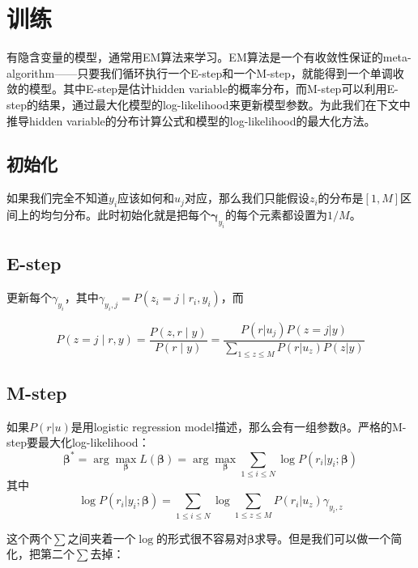 \documentclass[12pt,a4paper]{article}
\newcommand{\V}{\boldsymbol}
\begin{document}
\section{训练}

有隐含变量的模型，通常用EM算法来学习。EM算法是一个有收敛性保证的meta-algorithm——只要我们循环执行一个E-step和一个M-step，就能得到一个单调收敛的模型。其中E-step是估计hidden variable的概率分布，而M-step可以利用E-step的结果，通过最大化模型的log-likelihood来更新模型参数。为此我们在下文中推导hidden variable的分布计算公式和模型的log-likelihood的最大化方法。

\subsection{初始化}

如果我们完全不知道$y_i$应该如何和$u_j$对应，那么我们只能假设$z_i$的分布是$[1,M]$区间上的均匀分布。此时初始化就是把每个$\V\gamma_{y_i}$的每个元素都设置为$1/M$。

\subsection{E-step}

更新每个$\gamma_{y_i}$，其中$\gamma_{y_i,j}=P(z_i=j \mid r_i, y_i)$，而

\begin{equation}
\label{eq:estep}
P(z=j \mid r,y) = \frac{P(z,r \mid y)}{P(r\mid y)} = \frac{P(r|u_j) P(z=j|y)}{\sum_{1\leq z\leq M} P(r|u_z) P(z|y)}
\end{equation}

\subsection{M-step}

如果$P(r|u)$是用logistic regression model描述，那么会有一组参数$\V\beta$。严格的M-step要最大化log-likelihood：
\begin{equation}
\label{eq:logll}
\V\beta^* = \arg\max_{\V\beta} L(\V\beta) = \arg\max_{\V\beta} \sum_{1\leq i\leq N} \log P(r_i|y_i; \V\beta) 
\end{equation}
%
其中
\begin{equation}
\log P(r_i|y_i; \V\beta) 
= \sum_{1\leq i\leq N} \log \sum_{1\leq z\leq M} P(r_i|u_z) \gamma_{y_i,z}
\end{equation}

这个两个$\sum$之间夹着一个$\log$的形式很不容易对$\V\beta$求导。但是我们可以做一个简化，把第二个$\sum$去掉：
\end{document}

